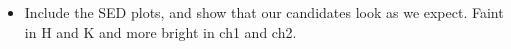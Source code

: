 \begin{itemize}
    \item Include the SED plots, and show that our candidates look as we expect. Faint in H and K and more bright in ch1 and ch2.
\end{itemize}

